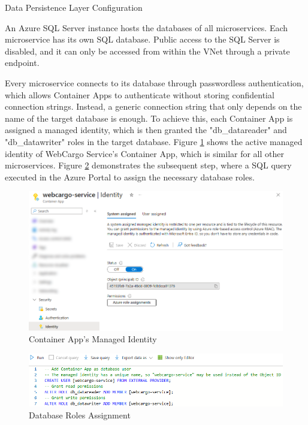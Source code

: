 \documentclass[12pt, reqno, oneside]{amsbook}
\makeatletter
\def\subsection{\@startsection{subsection}{2}%
      \z@{.5\linespacing\@plus.7\linespacing}{.25\linespacing}%
      {\normalfont\bfseries\flushleft}}
\theoremstyle{definition}
\theoremstyle{definition}
\numberwithin{section}{chapter}
\numberwithin{table}{chapter}
\numberwithin{figure}{chapter}
\makeatother
\begin{document}
\subsection{Data Persistence Layer Configuration}

An Azure SQL Server instance hosts the databases of all microservices. Each microservice has its own SQL database. Public access to the SQL Server is disabled, and it can only be accessed from within the \ac{VNet} through a private endpoint.

Every microservice connects to its database through passwordless authentication, which allows Container Apps to authenticate without storing confidential connection strings. Instead, a generic connection string that only depends on the name of the target database is enough. To achieve this, each Container App is assigned a managed identity, which is then granted the "db\_datareader" and "db\_datawriter" roles in the target database. Figure \ref{Figure:DatabaseConfigurationManagedIdentity} shows the active managed identity of WebCargo Service's Container App, which is similar for all other microservices.
Figure \ref{Figure:DatabaseConfigurationQuery} demonstrates the subsequent step, where a \ac{SQL} query executed in the Azure Portal to assign the necessary database roles.

\begin{figure}[H]
  \centering
  \includegraphics[width=0.9\linewidth]{images/DatabaseConfigurationManagedIdentity.png}
  \caption{\label{Figure:DatabaseConfigurationManagedIdentity}Container App's Managed Identity}
\end{figure}

\begin{figure}[H]
  \centering
  \includegraphics[width=1\linewidth]{images/DatabaseConfigurationQuery.png}
  \caption{\label{Figure:DatabaseConfigurationQuery}Database Roles Assignment}
\end{figure}
\end{document}
